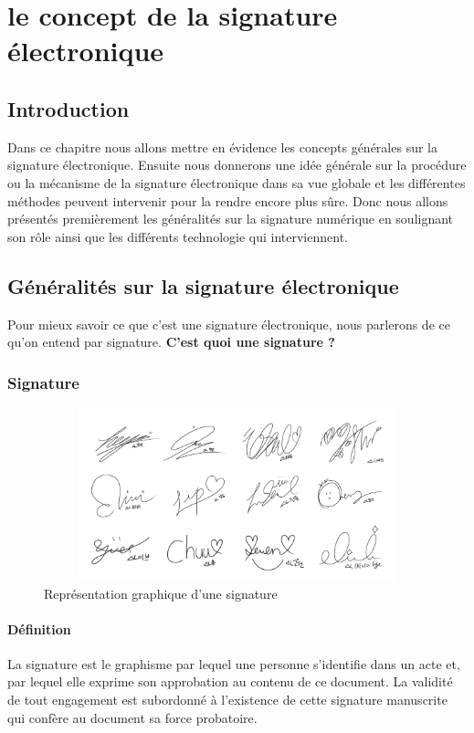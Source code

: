\chapter{le concept de la signature électronique}
	\section*{Introduction}
		Dans ce chapitre nous allons mettre en évidence les concepts générales sur la signature électronique. Ensuite nous donnerons une idée générale sur la procédure ou la mécanisme de la signature électronique dans sa vue globale et les différentes méthodes peuvent intervenir pour la rendre encore plus sûre. Donc nous allons présentés premièrement les généralités sur la signature numérique en soulignant son rôle ainsi que les différents technologie qui interviennent.
	
	\section{Généralités sur la signature électronique}
	Pour mieux savoir ce que c'est une signature électronique, nous parlerons de ce qu'on entend par signature. \textbf{C'est  quoi une signature ?} 
		\subsection{Signature}
		
		 	\begin{figure}[H]
		 		\centering
		 		\includegraphics[width=17cm, height=5cm]{../imgs/signature}
		 		\caption{Représentation graphique d'une signature}
		 		\label{signature}
		 	\end{figure}
			\subsubsection{Définition}
				La signature est le graphisme par lequel une personne s'identifie dans un acte et, par lequel elle exprime son approbation au contenu de ce document. La validité de tout engagement est subordonné à l'existence de cette signature manuscrite qui confère au document sa force probatoire.
				
